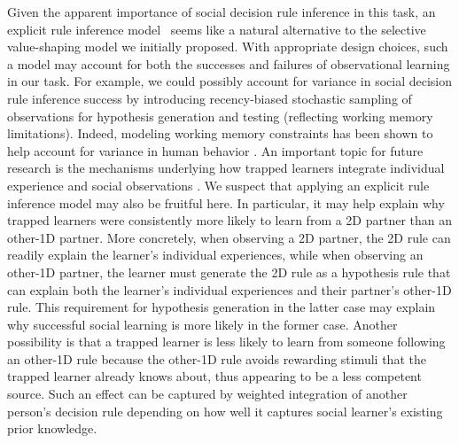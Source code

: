 \documentclass[11pt]{article} %
\begin{document}
Given the apparent importance of social decision rule inference in this task, an explicit rule inference model~\cite{goodmanRationalAnalysisRuleBased2008, chandraTheoriesMindLanguages2025} seems like a natural alternative to the selective value-shaping model we initially proposed. With appropriate design choices, such a model may account for both the successes and failures of observational learning in our task. For example, we could possibly account for variance in social decision rule inference success by introducing recency-biased stochastic sampling of observations for hypothesis generation and testing (reflecting working memory limitations). Indeed, modeling working memory constraints has been shown to help account for variance in human behavior \cite{collinsHowMuchReinforcement2012}. An important topic for future research is the mechanisms underlying how trapped learners integrate individual experience and social observations 
\cite{dalegeFormalizedAccountAttitudes2016, mollemanStrategiesIntegratingDisparate2020, wittHumansFlexiblyIntegrate2024, huCommonSenseReasoning2024, suIntegrationLanguageExperience2025, colasLanguageExperienceComputational2025}. We suspect that applying an explicit rule inference model may also be fruitful here. In particular, it may help explain why trapped learners were consistently more likely to learn from a 2D partner than an other-1D partner. More concretely, when observing a 2D partner, the 2D rule can readily explain the learner's individual experiences, while when observing an other-1D partner, the learner must generate the 2D rule as a hypothesis rule that can explain both the learner's individual experiences and their partner's other-1D rule. This requirement for hypothesis generation in the latter case may explain why successful social learning is more likely in the former case. Another possibility is that a trapped learner is less likely to learn from someone following an other-1D rule because the other-1D rule avoids rewarding stimuli that the trapped learner already knows about, thus appearing to be a less competent source. Such an effect can be captured by weighted integration of another person's decision rule depending on how well it captures social learner's existing prior knowledge. 
\end{document}
